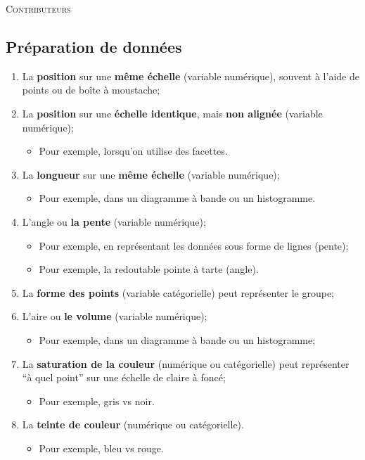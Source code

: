 \documentclass[10pt, french]{article}
\begin{document}
\begin{center}
	\textsc{\Large Contributeurs}\\[0.5cm] 
\end{center}


\newpage

\begin{multicols*}{3} 

\section{Préparation de données}

\begin{algo2}
\begin{enumerate}[leftmargin = *]
	\item	La \textbf{position} sur une \textbf{même échelle} (variable numérique), souvent à l’aide de points ou de boîte à moustache;
	\item	La \textbf{position} sur une \textbf{échelle identique}, mais \textbf{non alignée} (variable numérique);
		\begin{itemize}
		\item	Pour exemple, lorsqu’on utilise des facettes.
		\end{itemize}
	\item	La \textbf{longueur} sur une \textbf{même échelle} (variable numérique);
		\begin{itemize}
		\item	Pour exemple, dans un diagramme à bande ou un histogramme.
		\end{itemize}
	\item	L’angle ou \textbf{la pente} (variable numérique);
		\begin{itemize}
		\item	Pour exemple, en représentant les données sous forme de lignes (pente);
		\item	Pour exemple, la redoutable pointe à tarte (angle).
		\end{itemize}
	\item	La \textbf{forme des points} (variable catégorielle) peut représenter le groupe;
	\item	L’aire ou \textbf{le volume} (variable numérique);
		\begin{itemize}
		\item	Pour exemple, dans un diagramme à bande ou un histogramme;
		\end{itemize}
	\item	La \textbf{saturation de la couleur} (numérique ou catégorielle) peut représenter “à quel point” sur une échelle de claire à foncé;
		\begin{itemize}
		\item	Pour exemple, gris vs noir.
		\end{itemize}
	\item	La \textbf{teinte de couleur} (numérique ou catégorielle).
		\begin{itemize}
		\item	Pour exemple, bleu vs rouge.
		\end{itemize}
\end{enumerate}
\end{algo2}


\end{multicols*}
\end{document}
